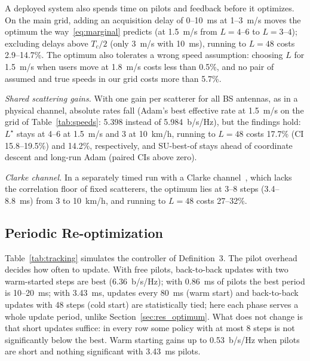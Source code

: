A deployed system also spends time on pilots and feedback before it optimizes. On the main grid, adding an acquisition delay of 0--10~ms at 1--3~m/s moves the optimum the way~\eqref{eq:marginal} predicts (at 1.5~m/s from $L=4$--$6$ to $L=3$--$4$); excluding delays above $T_c/2$ (only 3~m/s with 10~ms), running to $L=48$ costs 2.9--14.7\%. The optimum also tolerates a wrong speed assumption: choosing $L$ for 1.5~m/s when users move at 1.8~m/s costs less than 0.5\%, and no pair of assumed and true speeds in our grid costs more than 5.7\%.

\emph{Shared scattering gains.} With one gain per scatterer for all BS antennas, as in a physical channel, absolute rates fall (Adam's best effective rate at 1.5~m/s on the grid of Table~\ref{tab:speeds}: 5.398 instead of 5.984~b/s/Hz), but the findings hold: $L^\star$ stays at 4--6 at 1.5~m/s and 3 at 10~km/h, running to $L=48$ costs 17.7\% (CI 15.8--19.5\%) and 14.2\%, respectively, and SU-best-of stays ahead of coordinate descent and long-run Adam (paired CIs above zero).

\emph{Clarke channel.} In a separately timed run with a Clarke channel~\cite{Clarke1968BSTJ}, which lacks the correlation floor of fixed scatterers, the optimum lies at 3--8 steps (3.4--8.8~ms) from 3 to 10~km/h, and running to $L=48$ costs 27--32\%.

\subsection{Periodic Re-optimization}
\label{sec:res_tracking}
Table~\ref{tab:tracking} simulates the controller of Definition~3. The pilot overhead decides how often to update. With free pilots, back-to-back updates with two warm-started steps are best (6.36~b/s/Hz); with 0.86~ms of pilots the best period is 10--20~ms; with 3.43~ms, updates every 80~ms (warm start) and back-to-back updates with 48 steps (cold start) are statistically tied; here each phase serves a whole update period, unlike Section~\ref{sec:res_optimum}. What does not change is that short updates suffice: in every row some policy with at most 8 steps is not significantly below the best. Warm starting gains up to 0.53~b/s/Hz when pilots are short and nothing significant with 3.43~ms pilots.

\begin{table}[t]
\centering
\caption{Periodic re-optimization (aging set): best update period $U$ (ms; b2b = back-to-back) and steps per update $L$, with the time-averaged effective rate (b/s/Hz) for pilot durations $T_{\mathrm{p}}$. Warm$-$cold: paired difference of the two best policies; $^\S$not significant.}
\label{tab:tracking}
\footnotesize
\setlength{\tabcolsep}{5.5pt}

\end{table}

